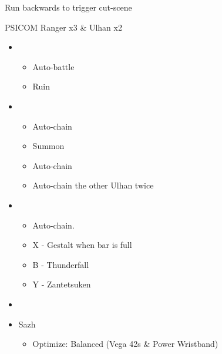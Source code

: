 Run backwards to trigger cut-scene

\begin{battle}{PSICOM Ranger x3 \& Ulhan x2}
\begin{itemize}
    \item \second
    \begin{itemize}
        \item Auto-battle
        \item Ruin
    \end{itemize}
    \item \fourth
    \begin{itemize}
        \item Auto-chain
        \item Summon
        \item Auto-chain
    \end{itemize}
    \begin{itemize}
        \item Auto-chain the other Ulhan twice
    \end{itemize}
    \item \fourth
    \begin{itemize}
        \item Auto-chain.
		\item X - Gestalt when bar is full
		\item B - Thunderfall
		\item Y - Zantetsuken
    \end{itemize}
\end{itemize}
 
\end{battle}


\begin{menu}
\begin{itemize}
    \paradigm
    \begin{itemize}
        \item {}%
{\paradigmline{\com}{\rav}{}}%
{\paradigmline[2]{\textit{\syn}}{\textit{\sab}}{}}%
{\paradigmline{\com}{(\sab)}{}}%
{\paradigmline{\rav}{\rav}{}}%
{\paradigmline{[\rav]}{(\sab)}{}}%
{\paradigmline{[\com]}{\rav}{}}
    \end{itemize}
    \equip
    \begin{itemize}
        \item Sazh
        \begin{itemize}
            \item Optimize: Balanced (Vega 42s \& Power Wristband)
        \end{itemize}
    \end{itemize}
\end{itemize}
\end{menu}

